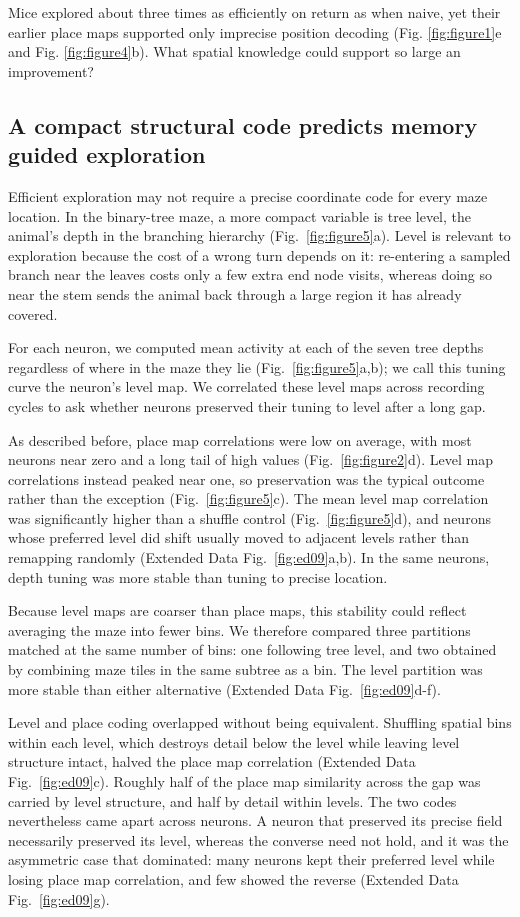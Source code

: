\documentclass[fleqn,10pt]{wlscirep}
\begin{document}
Mice explored about three times as efficiently on return as when naive, yet their earlier place maps supported only imprecise position decoding (Fig. \ref{fig:figure1}e and Fig. \ref{fig:figure4}b). What spatial knowledge could support so large an improvement?

\subsection*{A compact structural code predicts memory guided exploration}
Efficient exploration may not require a precise coordinate code for every maze location. In the binary-tree maze, a more compact variable is tree level, the animal's depth in the branching hierarchy (Fig.~\ref{fig:figure5}a). Level is relevant to exploration because the cost of a wrong turn depends on it: re-entering a sampled branch near the leaves costs only a few extra end node visits, whereas doing so near the stem sends the animal back through a large region it has already covered. 

For each neuron, we computed mean activity at each of the seven tree depths regardless of where in the maze they lie (Fig.~\ref{fig:figure5}a,b); we call this tuning curve the neuron's level map. We correlated these level maps across recording cycles to ask whether neurons preserved their tuning to level after a long gap.
 
As described before, place map correlations were low on average, with most neurons near zero and a long tail of high values (Fig.~\ref{fig:figure2}d). Level map correlations instead peaked near one, so preservation was the typical outcome rather than the exception (Fig.~\ref{fig:figure5}c). The mean level map correlation was significantly higher than a shuffle control (Fig.~\ref{fig:figure5}d), and neurons whose preferred level did shift usually moved to adjacent levels rather than remapping randomly (Extended Data Fig.~\ref{fig:ed09}a,b). In the same neurons, depth tuning was more stable than tuning to precise location.

Because level maps are coarser than place maps, this stability could reflect averaging the maze into fewer bins. We therefore compared three partitions matched at the same number of bins: one following tree level, and two obtained by combining maze tiles in the same subtree as a bin. The level partition was more stable than either alternative (Extended Data Fig.~\ref{fig:ed09}d-f). 

Level and place coding overlapped without being equivalent. Shuffling spatial bins within each level, which destroys detail below the level while leaving level structure intact, halved the place map correlation (Extended Data Fig.~\ref{fig:ed09}c). Roughly half of the place map similarity across the gap was carried by level structure, and half by detail within levels. The two codes nevertheless came apart across neurons. A neuron that preserved its precise field necessarily preserved its level, whereas the converse need not hold, and it was the asymmetric case that dominated: many neurons kept their preferred level while losing place map correlation, and few showed the reverse (Extended Data Fig.~\ref{fig:ed09}g).
\end{document}
